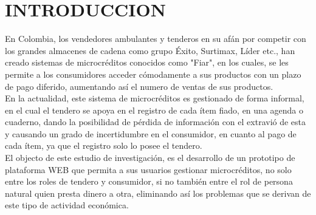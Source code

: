 \chapter*{INTRODUCCION}

{En Colombia, los vendedores ambulantes y tenderos en su afán por competir con los grandes almacenes de cadena como grupo Éxito, Surtimax, Líder etc., han creado sistemas de microcréditos conocidos como "Fiar", en los cuales, se les permite a los consumidores acceder cómodamente a sus productos con un plazo de pago diferido, aumentando así el numero de ventas de sus productos.\\

En la actualidad, este sistema de microcréditos es gestionado de forma informal, en el cual el tendero se apoya en el registro de cada ítem fiado, en una agenda o cuaderno, dando la posibilidad de pérdida de información con el extravió de esta y causando un grado de incertidumbre en el consumidor, en cuanto al pago de cada ítem, ya que el registro solo lo posee el tendero.\\

El objecto de este estudio de investigación, es el desarrollo de un prototipo de plataforma WEB que permita a sus usuarios gestionar microcréditos, no solo entre  los roles de tendero y consumidor, si no también entre el rol de persona natural quien presta dinero a otra, eliminando así los problemas que se derivan de este tipo de actividad económica.}